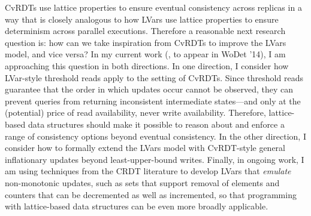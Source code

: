 \documentclass{article}
\begin{document}
CvRDTs use lattice properties to ensure eventual consistency across
replicas in a way that is closely analogous to how LVars use lattice
properties to ensure determinism across parallel executions.
Therefore a reasonable next research question is: how can we take
inspiration from CvRDTs to improve the LVars model, and vice versa?
In my current work (\cite{joining-wodet}, to appear in WoDet '14), I
am approaching this question in both directions.  In one direction, I
consider how LVar-style threshold reads apply to the setting of
CvRDTs.  Since threshold reads guarantee that the order in which
updates occur cannot be observed, they can prevent queries from
returning inconsistent intermediate states---and only at the
(potential) price of read availability, never write availability.
Therefore, lattice-based data structures should make it possible to
reason about and enforce a range of consistency options beyond
eventual consistency.  In the other direction, I consider how to
formally extend the LVars model with CvRDT-style general inflationary
updates beyond least-upper-bound writes.  Finally, in ongoing work, I
am using techniques from the CRDT literature \cite{crdts-tr} to
develop LVars that \emph{emulate} non-monotonic updates, such as sets
that support removal of elements and counters that can be decremented
as well as incremented, so that programming with lattice-based data
structures can be even more broadly applicable.


\newcommand{\myname}[0]{\textbf{Lindsey Kuper}}

\end{document}
